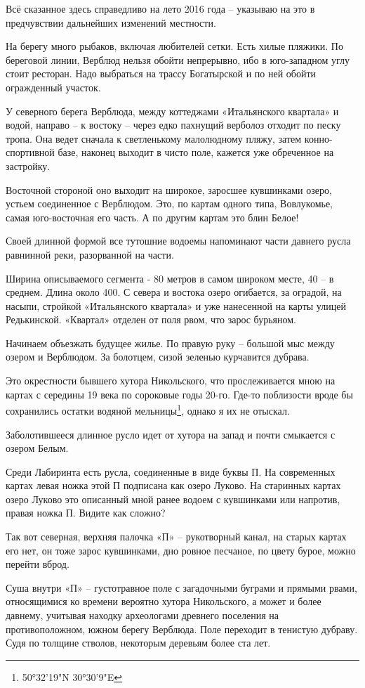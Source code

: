 Всё сказанное здесь справедливо на лето 2016 года – указываю на это в предчувствии дальнейших изменений местности.

На берегу много рыбаков, включая любителей сетки. Есть хилые пляжики. По береговой линии, Верблюд нельзя обойти непрерывно, ибо в юго-западном углу стоит ресторан. Надо выбраться на трассу Богатырской и по ней обойти огражденный участок.

У северного берега Верблюда, между коттеджами «Итальянского квартала» и водой, направо – к востоку – через едко пахнущий верболоз отходит по песку тропа. Она ведет сначала к светленькому малолюдному пляжу, затем конно-спортивной базе, наконец выходит в чисто поле, кажется уже обреченное на застройку.

Восточной стороной оно выходит на широкое, заросшее кувшинками озеро, устьем соединенное с Верблюдом. Это, по картам одного типа, Вовлукомье, самая юго-восточная его часть. А по другим картам это блин Белое!

Своей длинной формой все тутошние водоемы напоминают части давнего русла равнинной реки, разорванной на части. 

Ширина описываемого сегмента - 80 метров в самом широком месте, 40 – в среднем. Длина около 400. С севера и востока озеро огибается, за оградой, на насыпи, стройкой «Итальянского квартала» и уже нанесенной на карты улицей Редькинской. «Квартал» отделен от поля рвом, что зарос бурьяном.

Начинаем объезжать будущее жилье. По правую руку – большой мыс между озером и Верблюдом. За болотцем, сизой зеленью курчавится дубрава.

Это окрестности бывшего хутора Никольского, что прослеживается мною на картах с середины 19 века по сороковые годы 20-го. Где-то поблизости вроде бы сохранились остатки водяной мельницы\footnote{50°32'19"N 30°30'9"E}, однако я их не отыскал.

Заболотившееся длинное русло идет от хутора на запад и почти смыкается с озером Белым.

Среди Лабиринта есть русла, соединенные в виде буквы П. На современных картах левая ножка этой П подписана как озеро Луково. На старинных картах озеро Луково это описанный мной ранее водоем с кувшинками или напротив, правая ножка П. Видите как сложно?

Так вот северная, верхняя палочка «П» – рукотворный канал, на старых картах его нет, он тоже зарос кувшинками, дно ровное песчаное, по цвету бурое, можно перейти вброд.

Суша внутри «П» – густотравное поле с загадочными буграми и прямыми рвами, относящимися ко времени вероятно хутора Никольского, а может и более давнему, учитывая находку археологами древнего поселения на противоположном, южном берегу Верблюда. Поле переходит в тенистую дубраву. Судя по толщине стволов, некоторым деревьям более ста лет.




